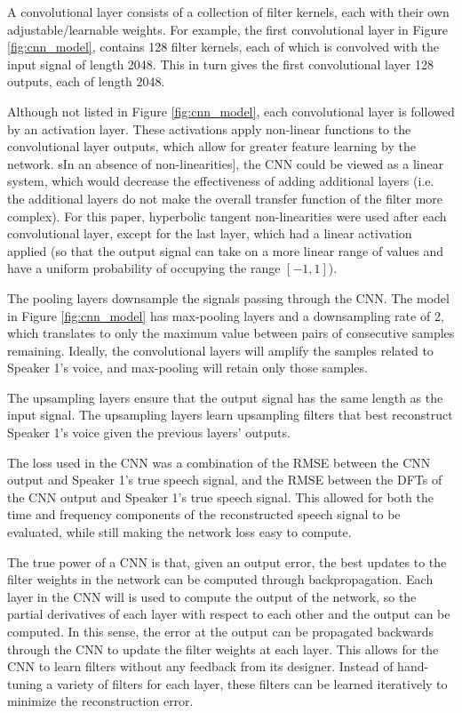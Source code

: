 \documentclass[12pt,chapterheads]{ucsd}
\begin{document}
A convolutional layer consists of a collection of filter kernels, each with their own adjustable/learnable weights. For example, the first convolutional layer in Figure \ref{fig:cnn_model}, contains 128 filter kernels, each of which is convolved with the input signal of length 2048. This in turn gives the first convolutional layer 128 outputs, each of length 2048.

Although not listed in Figure \ref{fig:cnn_model}, each convolutional layer is followed by an activation layer. These activations apply non-linear functions to the convolutional layer outputs, which allow for greater feature learning by the network. sIn an absence of non-linearities], the CNN could be viewed as a linear system, which would decrease the effectiveness of adding additional layers (i.e. the additional layers do not make the overall transfer function of the filter more complex). For this paper, hyperbolic tangent non-linearities were used after each convolutional layer, except for the last layer, which had a linear activation applied (so that the output signal can take on a more linear range of values and have a uniform probability of occupying the range $[-1, 1]$).

The pooling layers downsample the signals passing through the CNN. The model in Figure \ref{fig:cnn_model} has max-pooling layers and a downsampling rate of 2, which translates to only the maximum value between pairs of consecutive samples remaining. Ideally, the convolutional layers will amplify the samples related to Speaker 1's voice, and max-pooling will retain only those samples.

The upsampling layers ensure that the output signal has the same length as the input signal. The upsampling layers learn upsampling filters that best reconstruct Speaker 1's voice given the previous layers' outputs.

The loss used in the CNN was a combination of the RMSE between the CNN output and Speaker 1's true speech signal, and the RMSE between the DFTs of the CNN output and Speaker 1's true speech signal. This allowed for both the time and frequency components of the reconstructed speech signal to be evaluated, while still making the network loss easy to compute.

The true power of a CNN is that, given an output error, the best updates to the filter weights in the network can be computed through backpropagation. Each layer in the CNN will is used to compute the output of the network, so the partial derivatives of each layer with respect to each other and the output can be computed. In this sense, the error at the output can be propagated backwards through the CNN to update the filter weights at each layer. This allows for the CNN to learn filters without any feedback from its designer. Instead of hand-tuning a variety of filters for each layer, these filters can be learned iteratively to minimize the reconstruction error.
\end{document}
